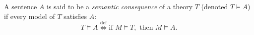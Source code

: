 

\setcounter{section}{3}
\setcounter{subsection}{1}
\setcounter{dfn}{9}

\begin{dfn}
A sentence $A$ is said to be a \emph{semantic consequence} of a theory $T$ (denoted $T \vDash A$) if every model of $T$ satisfies $A$:
\[
T \vDash A \stackrel{\mathrm{def}}{\Longleftrightarrow} \text{if } M \vDash T, \text{ then } M \vDash A.
\]
\end{dfn}


